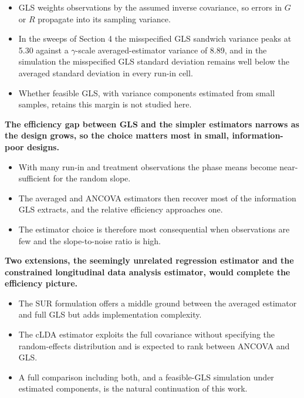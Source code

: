 \documentclass[
  11pt,
]{article}
\begin{document}
\begin{itemize}\setlength{\itemsep}{2pt}\setlength{\parskip}{0pt}
\item GLS weights observations by the assumed inverse covariance, so errors in $G$ or $R$ propagate into its sampling variance.
\item In the sweeps of Section 4 the misspecified GLS sandwich variance peaks at 5.30 against a $\gamma$-scale averaged-estimator variance of 8.89, and in the simulation the misspecified GLS standard deviation remains well below the averaged standard deviation in every run-in cell.
\item Whether feasible GLS, with variance components estimated from small samples, retains this margin is not studied here.
\end{itemize}

\textbf{The efficiency gap between GLS and the simpler estimators narrows as the design grows, so the choice matters most in small, information-poor designs.}

\begin{itemize}\setlength{\itemsep}{2pt}\setlength{\parskip}{0pt}
\item With many run-in and treatment observations the phase means become near-sufficient for the random slope.
\item The averaged and ANCOVA estimators then recover most of the information GLS extracts, and the relative efficiency approaches one.
\item The estimator choice is therefore most consequential when observations are few and the slope-to-noise ratio is high.
\end{itemize}

\textbf{Two extensions, the seemingly unrelated regression estimator and the constrained longitudinal data analysis estimator, would complete the efficiency picture.}

\begin{itemize}\setlength{\itemsep}{2pt}\setlength{\parskip}{0pt}
\item The SUR formulation offers a middle ground between the averaged estimator and full GLS but adds implementation complexity.
\item The cLDA estimator exploits the full covariance without specifying the random-effects distribution and is expected to rank between ANCOVA and GLS.
\item A full comparison including both, and a feasible-GLS simulation under estimated components, is the natural continuation of this work.
\end{itemize}
\end{document}
